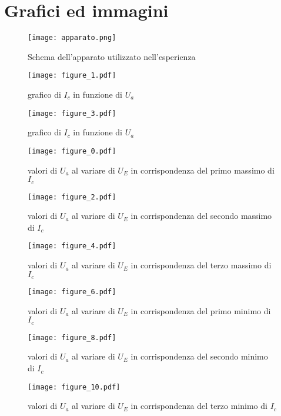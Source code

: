 \section{Grafici ed immagini}
\begin{figure}[h]
	\centering
	\texttt{[image: apparato.png]}
	\caption{Schema dell'apparato utilizzato nell'esperienza}
	\label{f:apparato}
\end{figure}

\begin{figure}[h]
	\centering
	\texttt{[image: figure\_1.pdf]}
	\caption{grafico di $I_c$ in funzione di $U_a$}
	\label{f:figura_1}
\end{figure}

\begin{figure}[h]
	\centering
	\texttt{[image: figure\_3.pdf]}
	\caption{grafico di $I_c$ in funzione di $U_a$}
	\label{f:figura_3}
\end{figure}

\begin{figure}[h]
	\centering
	\texttt{[image: figure\_0.pdf]}
	\caption{valori di $U_a$ al variare di $U_E$ in corrispondenza del primo massimo di $I_c$  }
	\label{f:figura_0}
\end{figure}

\begin{figure}[h]
	\centering
	\texttt{[image: figure\_2.pdf]}
	\caption{valori di $U_a$ al variare di $U_E$ in corrispondenza del secondo massimo di $I_c$  }
	\label{f:figura_2}
\end{figure}

\begin{figure}[h]
	\centering
	\texttt{[image: figure\_4.pdf]}
	\caption{valori di $U_a$ al variare di $U_E$ in corrispondenza del terzo massimo di $I_c$  }
	\label{f:figura_4}
\end{figure}

\begin{figure}[h]
	\centering
	\texttt{[image: figure\_6.pdf]}
	\caption{valori di $U_a$ al variare di $U_E$ in corrispondenza del primo minimo di $I_c$  }
	\label{f:figura_6}
\end{figure}

\begin{figure}[h]
	\centering
	\texttt{[image: figure\_8.pdf]}
	\caption{valori di $U_a$ al variare di $U_E$ in corrispondenza del secondo minimo di $I_c$  }
	\label{f:figura_8}
\end{figure}

\begin{figure}[h]
	\centering
	\texttt{[image: figure\_10.pdf]}
	\caption{valori di $U_a$ al variare di $U_E$ in corrispondenza del terzo minimo di $I_c$  }
	\label{f:figura_10}
\end{figure}